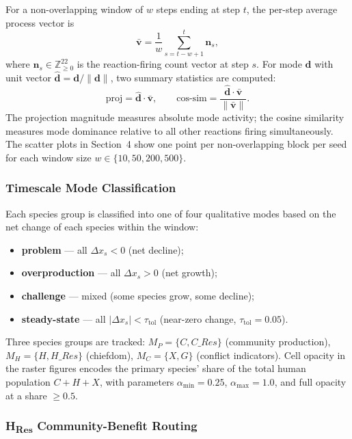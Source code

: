 For a non-overlapping window of $w$ steps ending at step $t$, the
per-step average process vector is
\begin{equation}
    \bar{\mathbf{v}} = \frac{1}{w}\sum_{s=t-w+1}^{t} \mathbf{n}_s,
\end{equation}
where $\mathbf{n}_s \in \mathbb{Z}_{\geq 0}^{22}$ is the reaction-firing
count vector at step $s$.  For mode $\mathbf{d}$ with unit vector
$\hat{\mathbf{d}} = \mathbf{d}/\|\mathbf{d}\|$, two summary statistics are
computed:
\begin{equation}
    \text{proj} = \hat{\mathbf{d}} \cdot \bar{\mathbf{v}},
    \qquad
    \text{cos-sim} = \frac{\hat{\mathbf{d}} \cdot \bar{\mathbf{v}}}
                          {\|\bar{\mathbf{v}}\|}.
\end{equation}
The projection magnitude measures absolute mode activity; the cosine
similarity measures mode dominance relative to all other reactions firing
simultaneously.  The scatter plots in Section~4 show one point per
non-overlapping block per seed for each window size
$w \in \{10, 50, 200, 500\}$.

\subsubsection*{Timescale Mode Classification}

Each species group is classified into one of four qualitative modes
based on the net change of each species within the window:
\begin{itemize}
    \item \textbf{problem} — all $\Delta x_s < 0$ (net decline);
    \item \textbf{overproduction} — all $\Delta x_s > 0$ (net growth);
    \item \textbf{challenge} — mixed (some species grow, some decline);
    \item \textbf{steady-state} — all $|\Delta x_s| < \tau_{\text{tol}}$
          (near-zero change, $\tau_{\text{tol}} = 0.05$).
\end{itemize}
Three species groups are tracked:
$M_P = \{C, C\_\textit{Res}\}$ (community production),
$M_H = \{H, H\_\textit{Res}\}$ (chiefdom),
$M_C = \{X, G\}$ (conflict indicators).
Cell opacity in the raster figures encodes the primary species' share of
the total human population $C + H + X$, with parameters
$\alpha_{\min} = 0.25$, $\alpha_{\max} = 1.0$, and full opacity at
a share $\geq 0.5$.

\subsubsection*{H\textsubscript{Res} Community-Benefit Routing}

